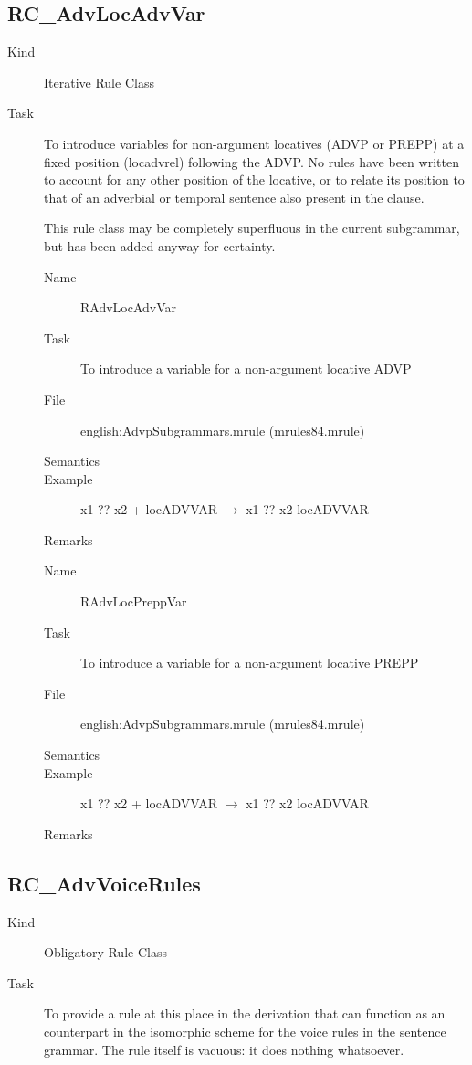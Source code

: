 \begin{description}
\begin{description}
\end{description}

\newpage
\subsection{RC\_AdvLocAdvVar}
\begin{description}
\item[Kind] Iterative Rule Class
\item[Task] To introduce variables for non-argument locatives (ADVP or PREPP) 
at a fixed position (locadvrel) following the ADVP. No rules have been 
written to account for any other position 
of the locative, or to relate its position to that of an adverbial or temporal 
sentence also present in the clause.

This rule class may be completely superfluous in the current subgrammar, but 
has been added anyway for certainty.

\vspace{1 cm}
\begin{description}
\item[Name] RAdvLocAdvVar
\item[Task] To introduce a variable for a non-argument locative ADVP 
\item[File] english:AdvpSubgrammars.mrule (mrules84.mrule)
\item[Semantics]
\item[Example] x1 ?? x2 + locADVVAR $\rightarrow$ x1 ?? x2 locADVVAR
\item[Remarks]
\end{description}

\vspace{1 cm}
\begin{description}
\item[Name] RAdvLocPreppVar
\item[Task] To introduce a variable for a non-argument locative PREPP
\item[File] english:AdvpSubgrammars.mrule (mrules84.mrule)
\item[Semantics]
\item[Example] x1 ?? x2 + locADVVAR $\rightarrow$ x1 ?? x2 locADVVAR
\item[Remarks]
\end{description}

\end{description}

\newpage
\subsection{RC\_AdvVoiceRules}
\begin{description}
\item[Kind] Obligatory Rule Class
\item[Task] To provide a rule at this place in the derivation that can function 
as an counterpart in the isomorphic scheme for the voice rules in the sentence 
grammar. The rule itself is vacuous: it does nothing whatsoever.


\end{description}
\end{description}
